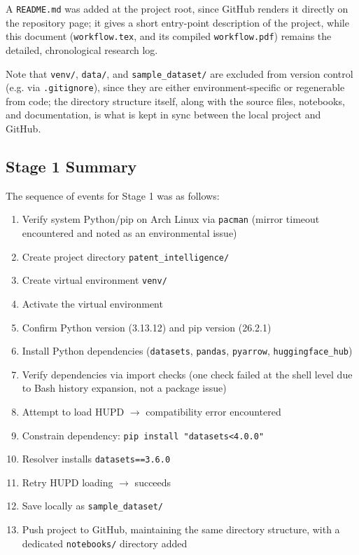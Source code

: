 \documentclass[11pt]{article}
\begin{document}
\noindent A \texttt{README.md} was added at the project root, since GitHub renders it directly on the repository page; it gives a short entry-point description of the project, while this document (\texttt{workflow.tex}, and its compiled \texttt{workflow.pdf}) remains the detailed, chronological research log.

\noindent Note that \texttt{venv/}, \texttt{data/}, and \texttt{sample\_dataset/} are excluded from version control (e.g. via \texttt{.gitignore}), since they are either environment-specific or regenerable from code; the directory structure itself, along with the source files, notebooks, and documentation, is what is kept in sync between the local project and GitHub.

\subsection{Stage 1 Summary}

The sequence of events for Stage 1 was as follows:

\begin{enumerate}
    \item Verify system Python/pip on Arch Linux via \texttt{pacman} (mirror timeout encountered and noted as an environmental issue)
    \item Create project directory \texttt{patent\_intelligence/}
    \item Create virtual environment \texttt{venv/}
    \item Activate the virtual environment
    \item Confirm Python version (3.13.12) and pip version (26.2.1)
    \item Install Python dependencies (\texttt{datasets}, \texttt{pandas}, \texttt{pyarrow}, \texttt{huggingface\_hub})
    \item Verify dependencies via import checks (one check failed at the shell level due to Bash history expansion, not a package issue)
    \item Attempt to load HUPD $\rightarrow$ compatibility error encountered
    \item Constrain dependency: \texttt{pip install "datasets<4.0.0"}
    \item Resolver installs \texttt{datasets==3.6.0}
    \item Retry HUPD loading $\rightarrow$ succeeds
    \item Save locally as \texttt{sample\_dataset/}
    \item Push project to GitHub, maintaining the same directory structure, with a dedicated \texttt{notebooks/} directory added
\end{enumerate}
\end{document}
